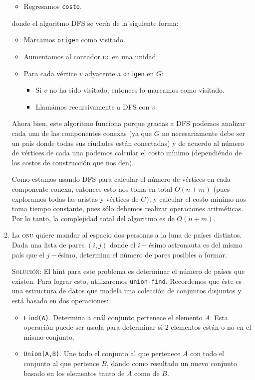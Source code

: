 \documentclass[letterpaper,11pt]{article}
\begin{document}
\begin{enumerate}
\begin{itemize}
        \item Regresamos \texttt{costo}.
    \end{itemize}

    donde el algoritmo DFS se vería de la siguiente forma:
    \begin{itemize}
        \item Marcamos \texttt{origen} como visitado.
        \item Aumentamos al contador \texttt{cc} en una unidad.
        \item Para cada vértice $v$ adyacente a \texttt{origen} en $G$:
        \begin{itemize}
            \item Si $v$ no ha sido visitado, entonces lo marcamos como 
            visitado.
            \item Llamámos recursivamente a DFS con $v$.
        \end{itemize}
    \end{itemize}

    Ahora bien, este algoritmo funciona porque gracias a DFS podemos analizar 
    cada una de las componentes conexas (ya que $G$ no necesariamente debe 
    ser un país donde todas sus ciudades están conectadas) y de acuerdo al 
    número de vértices de cada una podemos calcular el costo mínimo 
    (dependiéndo de los costos de construcción que nos den).

    Como estamos usando DFS para calcular el número de vértices en cada 
    componente conexa, entonces esto nos toma en total $O(n + m)$ (pues 
    exploramos todas las aristas y vértices de $G$); y calcular
    el costo mínimo nos toma tiempo constante, pues sólo debemos realizar 
    operaciones aritméticas. Por lo tanto, la complejidad total del algoritmo 
    es de $O(n + m)$.

    \item La \textsc{onu} quiere mandar al espacio dos personas a la luna de
    países distintos. Dada una lista de pares $(i, j)$ donde el $i-$ésimo 
    astronauta es del mismo país que el $j-$ésimo, determina el número de 
    pares posibles a formar. 

    \textsc{Solución:} El hint para este problema es determinar el número de 
    países que existen. Para lograr esto, utilizaremos \texttt{union-find}. 
    Recordemos que éste es una estructura de datos que modela una colección de 
    conjuntos disjuntos y está basado en dos operaciones:
    \begin{itemize}
        \item \texttt{Find(A)}. Determina a cuál conjunto pertenece el elemento 
        $A$. Esta operación puede ser usada para determinar si $2$ elementos 
        están o no en el mismo conjunto.
        \item \texttt{Union(A,B)}. Une todo el conjunto al que pertenece $A$ 
        con todo el conjunto al que pertence $B$, dando como resultado un nuevo 
        conjunto basado en los elementos tanto de $A$ como de $B$.
    \end{itemize}


\end{enumerate}
\end{document}
